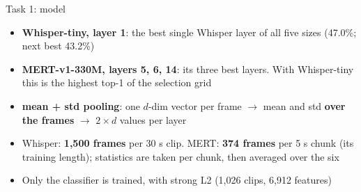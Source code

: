 \documentclass[aspectratio=169,11pt]{beamer}
\newenvironment{tight}{\begin{itemize}\setlength{\itemsep}{1.5pt}\setlength{\parskip}{0pt}\setlength{\topsep}{0pt}}{\end{itemize}}
\begin{document}
\begin{frame}[t]{Task 1: model}
  \raggedright\small
  \begin{tight}\footnotesize
    \item \textbf{Whisper-tiny, layer 1}: the best single Whisper layer of all five sizes (47.0\%; next best 43.2\%)
    \item \textbf{MERT-v1-330M, layers 5, 6, 14}: its three best layers. With Whisper-tiny this is the highest top-1 of the selection grid
    \item \textbf{mean + std pooling}: one $d$-dim vector per frame $\rightarrow$ mean and std \textbf{over the frames} $\rightarrow$ $2 \times d$ values per layer
    \item Whisper: \textbf{1,500 frames} per 30 s clip. MERT: \textbf{374 frames} per 5 s chunk (its training length); statistics are taken per chunk, then averaged over the six
    \item Only the classifier is trained, with strong L2 (1,026 clips, 6,912 features)
  \end{tight}
\end{frame}
\end{document}
